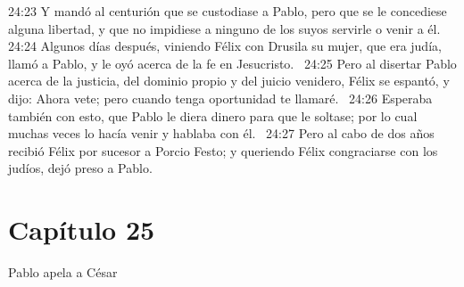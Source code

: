 24:23 Y mandó al centurión que se custodiase a Pablo, pero que se le concediese alguna libertad, y que no impidiese a ninguno de los suyos servirle o venir a él.  
24:24 Algunos días después, viniendo Félix con Drusila su mujer, que era judía, llamó a Pablo, y le oyó acerca de la fe en Jesucristo.  
24:25 Pero al disertar Pablo acerca de la justicia, del dominio propio y del juicio venidero, Félix se espantó, y dijo: Ahora vete; pero cuando tenga oportunidad te llamaré.  
24:26 Esperaba también con esto, que Pablo le diera dinero para que le soltase; por lo cual muchas veces lo hacía venir y hablaba con él.  
24:27 Pero al cabo de dos años recibió Félix por sucesor a Porcio Festo; y queriendo Félix congraciarse con los judíos, dejó preso a Pablo.  
\section*{Capítulo 25}
Pablo apela a César  

